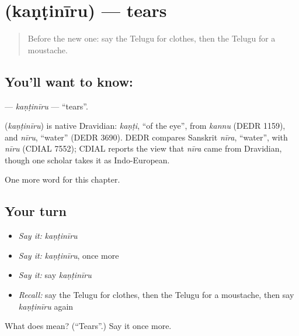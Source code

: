 \section[\texorpdfstring{\te{కంటినీరు} (kaṇṭinīru)}{కంటినీరు (kaṇṭinīru)}]{ (kaṇṭinīru) — tears}

\label{lesson:TE-C133-kantiniru}



\begin{quote}
Before the new one: say the Telugu for clothes, then the Telugu for a moustache.
\end{quote}

\subsection*{You'll want to know: }
\textbf{} — \emph{kaṇṭinīru} — \textquotedblleft{}tears\textquotedblright{}.

\begin{cousinweb}
\textbf{} (\emph{kaṇṭinīru}) is native Dravidian: \emph{kaṇṭi}, \textquotedblleft{}of the eye\textquotedblright{}, from \emph{kannu} (DEDR 1159), and \emph{nīru}, \textquotedblleft{}water\textquotedblright{} (DEDR 3690). DEDR compares Sanskrit \emph{nīra}, \textquotedblleft{}water\textquotedblright{}, with \emph{nīru} (CDIAL 7552); CDIAL reports the view that \emph{nīra} came from Dravidian, though one scholar takes it as Indo-European.
\end{cousinweb}

\begin{grammarlens}[title={What you've built}]
One more word for this chapter.
\end{grammarlens}

\subsection*{Your turn}
\begin{itemize}
\raggedright
  \item \emph{Say it:} \emph{kaṇṭinīru}
  \item \emph{Say it:} \emph{kaṇṭinīru}, once more
  \item \emph{Say it:} say \emph{kaṇṭinīru}
  \item \emph{Recall:} say the Telugu for clothes, then the Telugu for a moustache, then say \emph{kaṇṭinīru} again
\end{itemize}

\begin{tcolorbox}[breakable,colback=teal!4,colframe=teal!35!black,title={Before you move on}]
What does  mean? (\textquotedblleft{}Tears\textquotedblright{}.) Say it once more.
\end{tcolorbox}
